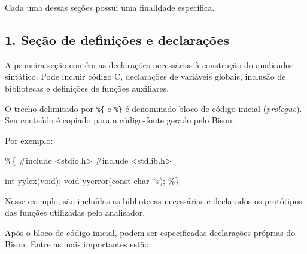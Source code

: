 \documentclass[
  brazilian,
  letterpaper,
]{book}
\newenvironment{Shaded}{\begin{snugshade}}{\end{snugshade}}
\newcommand{\DataTypeTok}[1]{\textcolor[rgb]{0.68,0.00,0.00}{#1}}
\newcommand{\ImportTok}[1]{\textcolor[rgb]{0.00,0.46,0.62}{#1}}
\newcommand{\NormalTok}[1]{\textcolor[rgb]{0.00,0.23,0.31}{#1}}
\newcommand{\OperatorTok}[1]{\textcolor[rgb]{0.37,0.37,0.37}{#1}}
\newcommand{\PreprocessorTok}[1]{\textcolor[rgb]{0.68,0.00,0.00}{#1}}
\theoremstyle{plain}
\theoremstyle{definition}
\theoremstyle{remark}
\begin{document}
Cada uma dessas seções possui uma finalidade específica.

\subsection{1. Seção de definições e
declarações}\label{seuxe7uxe3o-de-definiuxe7uxf5es-e-declarauxe7uxf5es}

A primeira seção contém as declarações necessárias à construção do
analisador sintático. Pode incluir código C, declarações de variáveis
globais, inclusão de bibliotecas e definições de funções auxiliares.

O trecho delimitado por \texttt{\%\{} e \texttt{\%\}} é denominado bloco
de código inicial (\emph{prologue}). Seu conteúdo é copiado para o
código-fonte gerado pelo Bison.

Por exemplo:

\begin{Shaded}
\begin{Highlighting}[]
\OperatorTok{\%\{}
\PreprocessorTok{\#include }\ImportTok{\textless{}stdio.h\textgreater{}}
\PreprocessorTok{\#include }\ImportTok{\textless{}stdlib.h\textgreater{}}

\DataTypeTok{int}\NormalTok{ yylex}\OperatorTok{(}\DataTypeTok{void}\OperatorTok{);}
\DataTypeTok{void}\NormalTok{ yyerror}\OperatorTok{(}\DataTypeTok{const} \DataTypeTok{char} \OperatorTok{*}\NormalTok{s}\OperatorTok{);}
\OperatorTok{\%\}}
\end{Highlighting}
\end{Shaded}

Nesse exemplo, são incluídas as bibliotecas necessárias e declarados os
protótipos das funções utilizadas pelo analisador.

Após o bloco de código inicial, podem ser especificadas declarações
próprias do Bison. Entre as mais importantes estão:
\end{document}
